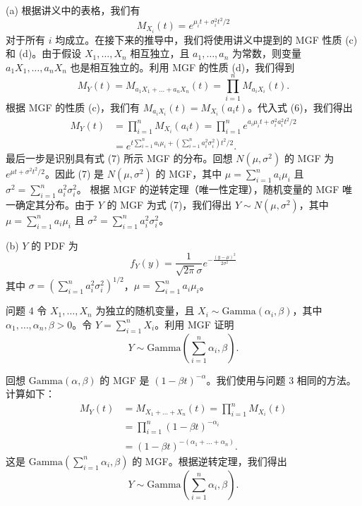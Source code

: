 \begin{questions}
\begin{solution}
(a) 根据讲义中的表格，我们有
\[
M_{X_i}(t) = e^{\mu_i t + \sigma_i^2 t^2 / 2}
\]
对于所有 $i$ 均成立。在接下来的推导中，我们将使用讲义中提到的 MGF 性质 (c) 和 (d)。由于假设 $X_1, \dots, X_n$ 相互独立，且 $a_1, \dots, a_n$ 为常数，则变量 $a_1 X_1, \dots, a_n X_n$ 也是相互独立的。利用 MGF 的性质 (d)，我们得到
\[
M_Y(t) = M_{a_1 X_1 + \dots + a_n X_n}(t) = \prod_{i=1}^n M_{a_i X_i}(t).
\]
根据 MGF 的性质 (c)，我们有 $M_{a_i X_i}(t) = M_{X_i}(a_i t)$。代入式 (6)，我们得出
\begin{align*}
M_Y(t) &= \prod_{i=1}^n M_{X_i}(a_i t) = \prod_{i=1}^n e^{a_i \mu_i t + \sigma_i^2 a_i^2 t^2 / 2} \\
&= e^{t \sum_{i=1}^n a_i \mu_i + (\sum_{i=1}^n a_i^2 \sigma_i^2) t^2 / 2}.
\end{align*}
最后一步是识别具有式 (7) 所示 MGF 的分布。回想 $N(\mu, \sigma^2)$ 的 MGF 为 $e^{\mu t + \sigma^2 t^2 / 2}$。因此 (7) 是 $N(\mu, \sigma^2)$ 的 MGF，其中 $\mu = \sum_{i=1}^n a_i \mu_i$ 且 $\sigma^2 = \sum_{i=1}^n a_i^2 \sigma_i^2$。
根据 MGF 的逆转定理（唯一性定理），随机变量的 MGF 唯一确定其分布。由于 $Y$ 的 MGF 为式 (7)，我们得出 $Y \sim N(\mu, \sigma^2)$，其中 $\mu = \sum_{i=1}^n a_i \mu_i$ 且 $\sigma^2 = \sum_{i=1}^n a_i^2 \sigma_i^2$。

(b) $Y$ 的 PDF 为
\[
f_Y(y) = \frac{1}{\sqrt{2\pi}\sigma} e^{-\frac{(y-\mu)^2}{2\sigma^2}}
\]
其中 $\sigma = (\sum_{i=1}^n a_i^2 \sigma_i^2)^{1/2}$，$\mu = \sum_{i=1}^n a_i \mu_i$。
\end{solution}

\question 问题 4 令 $X_1, \dots, X_n$ 为独立的随机变量，且 $X_i \sim \text{Gamma}(\alpha_i, \beta)$，其中 $\alpha_1, \dots, \alpha_n, \beta > 0$。令 $Y = \sum_{i=1}^n X_i$。利用 MGF 证明
\[
Y \sim \text{Gamma}\left( \sum_{i=1}^n \alpha_i, \beta \right).
\]

\begin{solution}
回想 $\text{Gamma}(\alpha, \beta)$ 的 MGF 是 $(1 - \beta t)^{-\alpha}$。我们使用与问题 3 相同的方法。计算如下：
\begin{align*}
M_Y(t) &= M_{X_1 + \dots + X_n}(t) = \prod_{i=1}^n M_{X_i}(t) \\
&= \prod_{i=1}^n (1 - \beta t)^{-\alpha_i} \\
&= (1 - \beta t)^{-(\alpha_1 + \dots + \alpha_n)}.
\end{align*}
这是 $\text{Gamma}(\sum_{i=1}^n \alpha_i, \beta)$ 的 MGF。根据逆转定理，我们得出
\[
Y \sim \text{Gamma}\left( \sum_{i=1}^n \alpha_i, \beta \right).
\]
\end{solution}


\end{questions}
